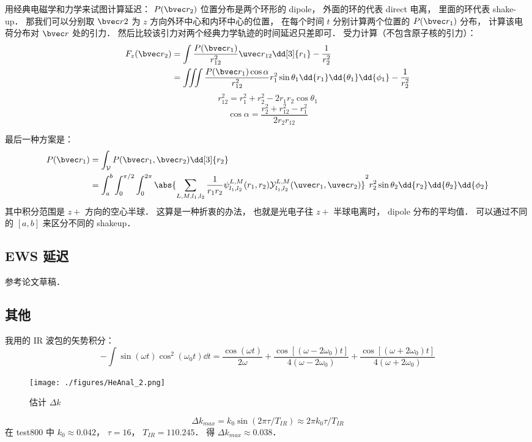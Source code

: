 用经典电磁学和力学来试图计算延迟： $P(\bvec r_2)$ 位置分布是两个环形的 dipole， 外面的环的代表 direct 电离， 里面的环代表 shake-up． 那我们可以分别取 $\bvec r2$ 为 $z$ 方向外环中心和内环中心的位置， 在每个时间 $t$ 分别计算两个位置的 $P(\bvec r_1)$ 分布， 计算该电荷分布对 $\bvec r$ 处的引力． 然后比较该引力对两个经典力学轨迹的时间延迟只差即可． 受力计算（不包含原子核的引力）：
\begin{equation}\label{HeAnal_eq19}
\begin{aligned}
F_z(\bvec r_2) &= 
\int \frac{P(\bvec r_1)}{r_{12}^2}\uvec r_{12} \dd[3]{r_1} - \frac{1}{r_2^2}\\
&= \iiint \frac{P(\bvec r_1) \cos\alpha}{r_{12}^2} r_1^2\sin\theta_1 \dd{r_1}\dd{\theta_1}\dd{\phi_1} - \frac{1}{r_2^2}
\end{aligned}
\end{equation}
\begin{equation}
r_{12}^2 = r_1^2 + r_2^2 - 2r_1r_2 \cos\theta_1
\end{equation}
\begin{equation}
\cos\alpha = \frac{r_2^2 + r_{12}^2 - r_1^2}{2r_2 r_{12}}
\end{equation}

最后一种方案是：
\begin{equation}
\begin{aligned}
P(\bvec r_1) &= \int_{\mathcal V} P(\bvec r_1, \bvec r_2) \dd[3]{r_2}\\
&= \int_a^b  \int_0^{\pi/2} \int_0^{2\pi} \abs{\sum_{L, M, l_1, l_2}  \frac{1}{r_1 r_2} \psi_{l_1, l_2}^{L, M}(r_1, r_2)\mathcal{Y}_{l_1, l_2}^{L, M}(\uvec r_1, \uvec r_2)}^2 r_2^2\sin\theta_2\dd{r_2} \dd{\theta_2} \dd{\phi_2}
\end{aligned}
\end{equation}
其中积分范围是 $z+$ 方向的空心半球． 这算是一种折衷的办法， 也就是光电子往 $z+$ 半球电离时， dipole 分布的平均值． 可以通过不同的 $[a, b]$ 来区分不同的 shakeup．

\subsection{EWS 延迟}
参考论文草稿．

\subsection{其他}
我用的 IR 波包的矢势积分：
\begin{equation}\label{HeAnal_eq20}
-\int \sin(\omega t)\cos^2(\omega_0 t) \dd{t} =
\frac{\cos(\omega t)}{2\omega} + \frac{\cos[(\omega-2\omega_0)t]}{4(\omega-2\omega_0)} + \frac{\cos[(\omega+2\omega_0)t]}{4(\omega+2\omega_0)}
\end{equation}


\begin{figure}[ht]
\centering
\texttt{[image: ./figures/HeAnal\_2.png]}
\caption{估计 $\Delta k$} \label{HeAnal_fig2}
\end{figure}
\begin{equation}
\Delta k_{max} = k_0 \sin(2\pi \tau/T_{IR}) \approx 2 \pi k_0  \tau/T_{IR}
\end{equation}
在 test800 中 $k_0 \approx 0.042$， $\tau = 16$， $T_{IR} = 110.245$． 得 $\Delta k_{max} \approx 0.038$．
